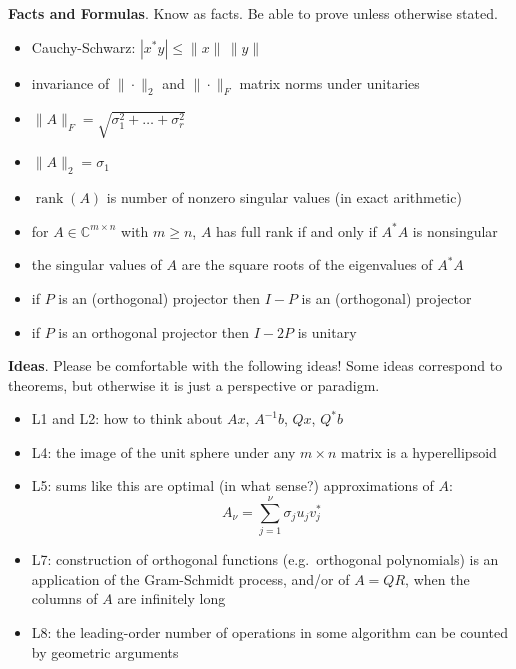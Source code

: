\documentclass[11pt]{amsart}
\newcommand{\normalspacing}{\renewcommand{\baselinestretch}{1.1}\tiny\normalsize}
\newcommand{\bigspacing}{\renewcommand{\baselinestretch}{1.21}\tiny\normalsize}
\newcommand{\CC}{{\mathbb{C}}}
\newcommand{\rank}{\operatorname{rank}}
\begin{document}
\newpage\noindent \textbf{Facts and Formulas}.  Know as facts.  Be able to prove unless otherwise stated.
\begin{itemize}
\item Cauchy-Schwarz: $|x^* y| \le \|x\|\,\|y\|$ 
\item invariance of $\|\cdot\|_2$ and $\|\cdot\|_F$ matrix norms under unitaries
\item $\|A\|_F = \sqrt{\sigma_1^2 + \dots + \sigma_r^2}$
\item $\|A\|_2 = \sigma_1$
\item $\rank(A)$ is number of nonzero singular values (in exact arithmetic)
\item for $A\in \CC^{m\times n}$ with $m\ge n$, $A$ has full rank if and only if $A^* A$ is nonsingular
\item the singular values of $A$ are the square roots of the eigenvalues of $A^*A$
\item if $P$ is an (orthogonal) projector then $I-P$ is an (orthogonal) projector
\item if $P$ is an orthogonal projector then $I-2P$ is unitary
\end{itemize}

\normalspacing

\bigskip\noindent \textbf{Ideas}.  Please be comfortable with the following ideas!  Some ideas correspond to theorems, but otherwise it is just a perspective or paradigm.

\bigspacing
\begin{itemize}
\item L1 and L2: how to think about $Ax$, $A^{-1}b$, $Qx$, $Q^* b$
\item L4: the image of the unit sphere under any $m\times n$ matrix is a hyperellipsoid
\item L5: sums like this are optimal (in what sense?) approximations of $A$:
	$$A_\nu = \sum_{j=1}^\nu \sigma_j u_j v_j^*$$
\item L7: construction of orthogonal functions (e.g.~orthogonal polynomials) is an application of the Gram-Schmidt process, and/or of $A=QR$, when the columns of $A$ are infinitely long
\item L8: the leading-order number of operations in some algorithm can be counted by geometric arguments
\end{itemize}
\end{document}
